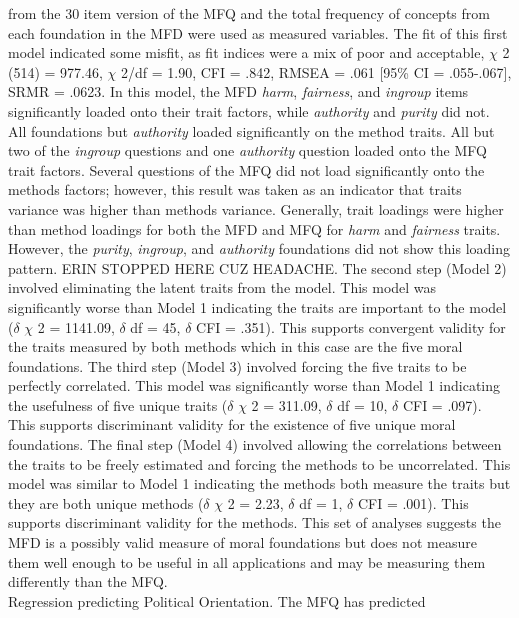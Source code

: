\documentclass[english,man]{apa6}
\newcounter{author}
\theoremstyle{definition}
\theoremstyle{definition}
\theoremstyle{definition}
\theoremstyle{remark}
\begin{document}
from the 30 item version of the MFQ and the total frequency of concepts
from each foundation in the MFD were used as measured variables. The fit
of this first model indicated some misfit, as fit indices were a mix of
poor and acceptable, \(\chi\) 2 (514) = 977.46, \(\chi\) 2/df = 1.90,
CFI = .842, RMSEA = .061 {[}95\% CI = .055-.067{]}, SRMR = .0623. In
this model, the MFD \emph{harm}, \emph{fairness}, and \emph{ingroup}
items significantly loaded onto their trait factors, while
\emph{authority} and \emph{purity} did not. All foundations but
\emph{authority} loaded significantly on the method traits. All but two
of the \emph{ingroup} questions and one \emph{authority} question loaded
onto the MFQ trait factors. Several questions of the MFQ did not load
significantly onto the methods factors; however, this result was taken
as an indicator that traits variance was higher than methods variance.
Generally, trait loadings were higher than method loadings for both the
MFD and MFQ for \emph{harm} and \emph{fairness} traits. However, the
\emph{purity}, \emph{ingroup}, and \emph{authority} foundations did not
show this loading pattern. ERIN STOPPED HERE CUZ HEADACHE. The second
step (Model 2) involved eliminating the latent traits from the model.
This model was significantly worse than Model 1 indicating the traits
are important to the model (\(\delta\) \(\chi\) 2 = 1141.09, \(\delta\)
df = 45, \(\delta\) CFI = .351). This supports convergent validity for
the traits measured by both methods which in this case are the five
moral foundations. The third step (Model 3) involved forcing the five
traits to be perfectly correlated. This model was significantly worse
than Model 1 indicating the usefulness of five unique traits (\(\delta\)
\(\chi\) 2 = 311.09, \(\delta\) df = 10, \(\delta\) CFI = .097). This
supports discriminant validity for the existence of five unique moral
foundations. The final step (Model 4) involved allowing the correlations
between the traits to be freely estimated and forcing the methods to be
uncorrelated. This model was similar to Model 1 indicating the methods
both measure the traits but they are both unique methods (\(\delta\)
\(\chi\) 2 = 2.23, \(\delta\) df = 1, \(\delta\) CFI = .001). This
supports discriminant validity for the methods. This set of analyses
suggests the MFD is a possibly valid measure of moral foundations but
does not measure them well enough to be useful in all applications and
may be measuring them differently than the MFQ.\\
Regression predicting Political Orientation. The MFQ has predicted
\end{document}
